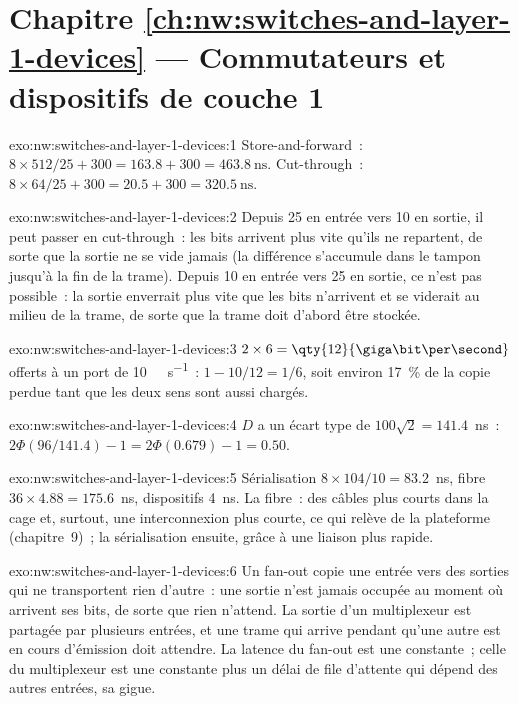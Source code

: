 \section*{Chapitre \ref{ch:nw:switches-and-layer-1-devices} --- Commutateurs et dispositifs de couche 1}

\begin{solution}{exo:nw:switches-and-layer-1-devices:1}
Store-and-forward~: $8 \times 512 / 25 + 300 = 163.8 + 300 = \qty{463.8}{\nano\second}$. Cut-through~:
$8 \times 64 / 25 + 300 = 20.5 + 300 = \qty{320.5}{\nano\second}$.
\end{solution}

\begin{solution}{exo:nw:switches-and-layer-1-devices:2}
Depuis 25 en entrée vers 10 en sortie, il peut passer en cut-through~: les bits arrivent plus vite qu'ils ne repartent, de sorte que la sortie ne se vide jamais (la différence
s'accumule dans le tampon jusqu'à la fin de la trame). Depuis 10 en entrée vers 25 en sortie, ce n'est pas possible~: la sortie enverrait plus vite que les bits
n'arrivent et se viderait au milieu de la trame, de sorte que la trame doit d'abord être stockée.
\end{solution}

\begin{solution}{exo:nw:switches-and-layer-1-devices:3}
$2 \times 6 = \qty{12}{\giga\bit\per\second}$ offerts à un port de \qty{10}{\giga\bit\per\second}~: $1 - 10/12 = 1/6$, soit environ 17~\% de
la copie perdue tant que les deux sens sont aussi chargés.
\end{solution}

\begin{solution}{exo:nw:switches-and-layer-1-devices:4}
$D$ a un écart type de $100\sqrt2 = 141.4$~ns~: $2\Phi(96/141.4) - 1 = 2\Phi(0.679) - 1 = 0.50$.
\end{solution}

\begin{solution}{exo:nw:switches-and-layer-1-devices:5}
Sérialisation $8 \times 104/10 = 83.2$~ns, fibre $36 \times 4.88 = 175.6$~ns, dispositifs 4~ns. La fibre~: des câbles plus courts dans la cage
et, surtout, une interconnexion plus courte, ce qui relève de la plateforme (chapitre~9)~; la sérialisation ensuite, grâce à une liaison plus rapide.
\end{solution}

\begin{solution}{exo:nw:switches-and-layer-1-devices:6}
Un fan-out copie une entrée vers des sorties qui ne transportent rien d'autre~: une sortie n'est jamais occupée au moment où arrivent ses bits, de sorte que rien n'attend. La
sortie d'un multiplexeur est partagée par plusieurs entrées, et une trame qui arrive pendant qu'une autre est en cours d'émission doit attendre. La
latence du fan-out est une constante~; celle du multiplexeur est une constante plus un délai de file d'attente qui dépend des autres entrées, sa gigue.
\end{solution}

